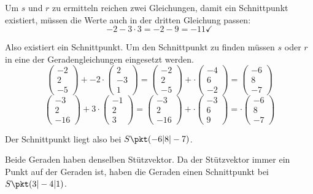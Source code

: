 \documentclass[11pt, a5paper, landscape]{scrartcl}
\begin{document}
\begin{loesung}
\begin{enumeratea}
			Um $s$ und $r$ zu ermitteln reichen zwei Gleichungen, damit ein Schnittpunkt existiert, müssen die Werte auch in der dritten Gleichung passen:
			\[  -2 - 3\cdot 3 = -2 - 9 = -11 \checkmark \]
			
			Also existiert ein Schnittpunkt. Um den Schnittpunkt zu finden müssen $s$ oder $r$ in eine der Geradengleichungen eingesetzt werden.
			\[ \begin{pmatrix} -2 \\ 2 \\ -5 \end{pmatrix} + -2\cdot \begin{pmatrix} 2 \\ -3 \\ 1 \end{pmatrix} = \begin{pmatrix} -2 \\ 2 \\ -5 \end{pmatrix} + \cdot \begin{pmatrix} -4 \\ 6 \\ -2 \end{pmatrix} = \begin{pmatrix} -6 \\ 8 \\ -7 \end{pmatrix} \]
			\[ \begin{pmatrix} -3 \\ 2 \\ -16 \end{pmatrix} + 3\cdot \begin{pmatrix} -1 \\ 2 \\ 3 \end{pmatrix} = \begin{pmatrix} -3 \\ 2 \\ -16 \end{pmatrix} + \cdot \begin{pmatrix} -3 \\ 6 \\ 9 \end{pmatrix} = \cdot \begin{pmatrix} -6 \\ 8 \\ -7 \end{pmatrix} \]
			
			Der Schnittpunkt liegt also bei $S\pkt(-6|8|-7)$.
			
			\item Beide Geraden haben denselben Stützvektor. Da der Stützvektor immer ein Punkt auf der Geraden ist, haben die Geraden einen Schnittpunkt bei $S\pkt(3|-4|1)$.
		\end{enumeratea}
		\clearpage
	\end{loesung}
	
\end{document}
